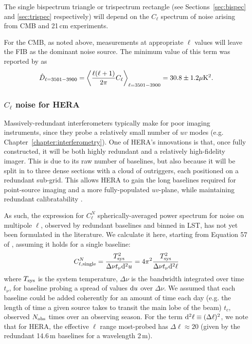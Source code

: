 The single bispectrum triangle or trispectrum rectangle (see Sections~\ref{sec:bispec} and \ref{sec:trispec} respectively) will depend on the $C_{\ell}$ spectrum of noise arising from CMB and 21\,cm experiments. 

For the CMB, as noted above, measurements at appropriate $\ell$ values will leave the FIB as the dominant noise source. The minimum value of this term was reported by \cite{George.15} as 
\begin{equation}
\hat{D}_{\ell = 3501 - 3900} = \left\langle \frac{\ell(\ell+1)}{2\pi}C_{\ell} \right\rangle_{\ell = 3501 - 3900} = 30.8\pm 1.2\mu {\rm K}^2.
\end{equation}

\subsubsection{$C_{\ell}$ noise for HERA}

Massively-redundant interferometers typically make for poor imaging instruments, since they probe a relatively small number of $uv$ modes (e.g. Chapter~\ref{chapter:interferometry}). One of HERA's innovations is that, once fully constructed, it will be both highly redundant and a relatively high-fidelity imager. This is due to its raw number of baselines, but also because it will be split in to three dense sections with a cloud of outriggers, each positioned on a redundant sub-grid. This allows HERA to gain the long baselines required for point-source imaging and a more fully-populated $uv$-plane, while maintaining redundant calibratability \citep{Dillon.16, deBoer.17}.

As such, the expression for $C^N_{\ell}$ spherically-averaged power spectrum for noise on multipole $\ell$, observed by redundant baselines and binned in LST, has not yet been formulated in the literature. We calculate it here, starting from Equation 57 of \cite{Zaldarriaga.04}, assuming it holds for a single baseline:
\begin{equation}
C^N_{\ell, {\rm single}} = \frac{T_{\rm sys}^2}{\Delta\nu t_{\nu} {\rm d}^2 u} = 4\pi^2 \frac{T_{\rm sys}^2}{\Delta\nu t_{\nu} {\rm d}^2 \ell}
\end{equation}
where $T_{\rm sys}$ is the system temperature, $\Delta\nu$ is the bandwidth integrated over time $t_{\nu}$, for baseline probing a spread of values ${\rm d}u$ over $\Delta\nu$.
We assumed that each baseline could be added coherently for an amount of time each day (e.g. the length of time a given source takes to transit the main lobe of the beam) $t_c$, observed $N_{\rm obs}$ times over an observing season. 
For the term ${\rm d}^2\ell \equiv (\Delta\ell)^2$, we note that for HERA, the effective $\ell$ range most-probed has $\Delta\ell\approx 20$ (given by the redundant 14.6\,m baselines for a wavelength 2\,m). 

